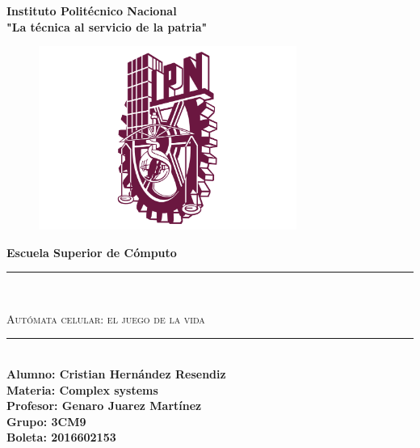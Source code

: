 \begin{titlepage}
	\begin{center}
		{\huge \textbf{Instituto Politécnico Nacional}}\\
		\vspace{1cm}%
		{\large \textbf{"La técnica al servicio de la patria"}}\\
		\vspace{3mm}
		\begin{figure}[h]
			\centering%
			\includegraphics[height=6cm]{logoIPN.PNG}
		\end{figure}
		\vspace{3mm}
		{\LARGE \textbf{Escuela Superior de Cómputo}}\\
		\vspace{3mm}
		\textcolor{azul}{\rule{\linewidth}{0.75mm}}%
		\\
		\begin{spacing}{1.5}
			{\LARGE \textsc{Autómata celular: el juego de la vida}}
		\end{spacing}
		\textcolor{azul}{\rule{\linewidth}{0.75mm}}\\
		\vspace{5mm}
		{\large \textbf{Alumno: Cristian Hernández Resendiz}}\\
		{\large \textbf{Materia: Complex systems}}\\
		\vspace{2mm}
		{\large \textbf{Profesor: Genaro Juarez Martínez}}\\
		\vspace{2mm}
		{\large \textbf{Grupo: 3CM9}}\\
		\vspace{2mm}
		{\large \textbf{Boleta: 2016602153}}\\
	\end{center}
\end{titlepage}

